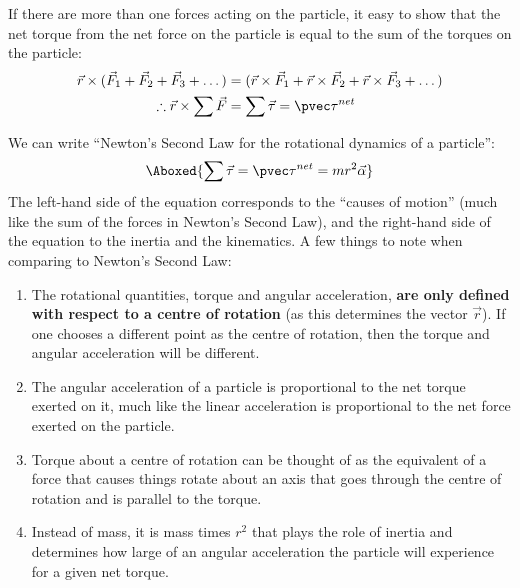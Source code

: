 If there are more than one forces acting on the particle, it easy to show that the net torque from the net force on the particle is equal to the sum of the torques on the particle:
\begin{align*}
\vec r \times (\vec F_1 + \vec F_2 + \vec F_3 + \dots) &=  (\vec r \times \vec F_1 + \vec r \times \vec F_2 + \vec r \times \vec F_3 + \dots) \\
\therefore \vec r \times \sum \vec F &= \sum \vec \tau = \pvec \tau^{net}
\end{align*}

We can write ``Newton's Second Law for the rotational dynamics of a particle'':
\begin{align}
\Aboxed{\sum \vec \tau = \pvec \tau ^{net} = mr^2 \vec \alpha}
\end{align}
The left-hand side of the equation corresponds to the ``causes of motion'' (much like the sum of the forces in Newton's Second Law), and the right-hand side of the equation to the inertia and the kinematics. A few things to note when comparing to Newton's Second Law:
\begin{enumerate}
\item The rotational quantities, torque and angular acceleration, \textbf{are only defined with respect to a centre of rotation} (as this determines the vector $\vec r$). If one chooses a different point as the centre of rotation, then the torque and angular acceleration will be different.
\item The angular acceleration of a particle is proportional to the net torque exerted on it, much like the linear acceleration is proportional to the net force exerted on the particle.
\item Torque about a centre of rotation can be thought of as the equivalent of a force that causes things rotate about an axis that goes through the centre of rotation and is parallel to the torque.
\item Instead of mass, it is mass times $r^2$ that plays the role of inertia and determines how large of an angular acceleration the particle will experience for a given net torque.  
\end{enumerate}

